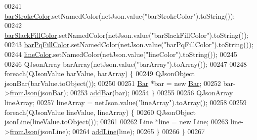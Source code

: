 \begin{DoxyCode}
00241   \hyperlink{class_network_ad69052271ab0a9899948815b6201f2c6}{barStrokeColor}.setNamedColor(netJson.value(\textcolor{stringliteral}{"barStrokeColor"}).toString());
00242   \hyperlink{class_network_ad78d9a206daf4ba0780067b5043c7f5c}{barSlackFillColor}.setNamedColor(netJson.value(\textcolor{stringliteral}{"barSlackFillColor"}).toString());
00243   \hyperlink{class_network_a386f492f548ec13f5d0e350c4f2217aa}{barPqFillColor}.setNamedColor(netJson.value(\textcolor{stringliteral}{"barPqFillColor"}).toString());
00244   \hyperlink{class_network_a453db7f1a994603fe4d38ac5899eb09c}{lineColor}.setNamedColor(netJson.value(\textcolor{stringliteral}{"lineColor"}).toString());
00245 
00246   QJsonArray barArray(netJson.value(\textcolor{stringliteral}{"barArray"}).toArray());
00247 
00248   \textcolor{keywordflow}{foreach}(QJsonValue barValue, barArray) \{
00249     QJsonObject jsonBar(barValue.toObject());
00250 
00251     \hyperlink{class_bar}{Bar} *bar = \textcolor{keyword}{new} \hyperlink{class_bar}{Bar};
00252     bar->\hyperlink{group___models_ga1df62f03dd3a066ceaf6588ba6bb6004}{fromJson}(jsonBar);
00253     \hyperlink{group___graphics_ga8c5dfef0216731246f7411e1a5fbee01}{addBar}(bar);
00254   \}
00255 
00256   QJsonArray lineArray;
00257   lineArray = netJson.value(\textcolor{stringliteral}{"lineArray"}).toArray();
00258 
00259   \textcolor{keywordflow}{foreach}(QJsonValue lineValue, lineArray) \{
00260     QJsonObject jsonLine(lineValue.toObject());
00261 
00262     \hyperlink{class_line}{Line} *line = \textcolor{keyword}{new} \hyperlink{class_line}{Line};
00263     line->\hyperlink{group___models_ga62623ad71df5279377cc69da90decc75}{fromJson}(jsonLine);
00264     \hyperlink{group___graphics_gae02945131494987b3ff9b59b627719b4}{addLine}(line);
00265   \}
00266 \}
00267 
\end{DoxyCode}
